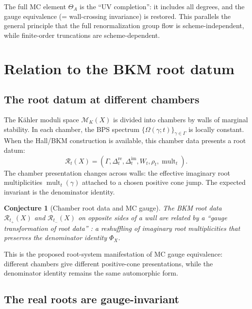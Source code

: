 \documentclass[11pt]{article}
\newtheorem{conjecture}[theorem]{Conjecture}
\theoremstyle{definition}
\theoremstyle{remark}
\newcommand{\cM}{\mathcal{M}}
\newcommand{\cR}{\mathcal{R}}
\DeclareMathOperator{\mult}{mult}
\begin{document}
The full MC element $\Theta_A$ is the ``UV completion'': it includes all
degrees, and the gauge equivalence (= wall-crossing invariance) is restored.
This parallels the general principle that the full renormalization group
flow is scheme-independent, while finite-order truncations are
scheme-dependent.

\section{Relation to the BKM root datum}
\label{sec:bkm-root-wc}

\subsection{The root datum at different chambers}
\label{ssec:root-chambers}

The K\"ahler moduli space $\cM_K(X)$ is divided into chambers by walls
of marginal stability. In each chamber, the BPS spectrum
$\{\Omega(\gamma; t)\}_{\gamma \in \Gamma}$ is locally constant. When
the Hall/BKM construction is available, this chamber data presents a root
datum:
\[
 \cR_t(X) = (\Gamma, \Delta^{\mathrm{re}}_t, \Delta^{\mathrm{im}}_t,
 W_t, \rho_t, \mult_t).
\]
The chamber presentation changes across walls: the effective imaginary
root multiplicities $\mult_t(\gamma)$ attached to a chosen positive cone
jump. The expected invariant is the denominator identity.

\begin{conjecture}[Chamber root data and MC gauge]
\label{prop:root-data-gauge-equiv}
The BKM root data $\cR_{t_+}(X)$ and $\cR_{t_-}(X)$ on opposite sides
of a wall are related by a ``gauge transformation of root data''
: a reshuffling of imaginary root multiplicities that preserves the
denominator identity $\Phi_X$.
\end{conjecture}

This is the proposed root-system manifestation of MC gauge equivalence:
different chambers give different positive-cone presentations, while the
denominator identity remains the same automorphic form.

\subsection{The real roots are gauge-invariant}
\label{ssec:real-roots-inv}
\end{document}
